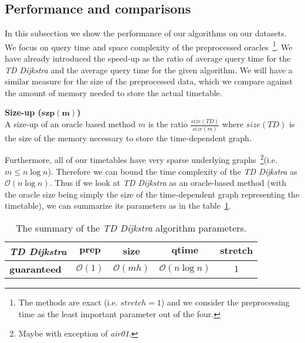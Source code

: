 \subsection{Performance and comparisons}

	\noindent In this subsection we show the performance of our algorithms on our datasets. We focus on query time and space complexity of the preprocessed oracles~\footnote{The methods are exact (i.e. $stretch = 1$) and we consider the preprocessing time as the least important parameter out of the four.}. We have already introduced the speed-up as the ratio of average query time for the \textit{TD Dijkstra} and the average query time for the given algorithm. We will have a similar measure for the size of the preprocessed data, which we compare against the amount of memory needed to store the actual timetable.
	
	\begin{definition}
		\textbf{Size-up ($\bm{szp(m)}$)}\\
		A size-up of an oracle based method $m$ is the ratio $\frac{\displaystyle size(TD)}{\displaystyle size(m)}$ where $size(TD)$ is the size of the memory necessary to store the time-dependent graph.
	\end{definition}
	
	\noindent Furthermore, all of our timetables have very sparse underlying graphs~\footnote{Maybe with exception of \textit{air01}.}(i.e. $m \leq n \log n$). Therefore we can bound the time complexity of the \textit{TD Dijkstra} as $\mathcal{O}(n \log n)$. Thus if we look at \textit{TD Dijkstra} as an oracle-based method (with the oracle size being simply the size of the time-dependent graph representing the timetable), we can summarize its parameters as in the table~\ref{tab:tddijkstra}.
	
	\begin{table}[h!]
		\centering
		\begin{tabular}{l|c|c|c|c}
			\cellcolor{oracle-clr} \textit{\textbf{TD Dijkstra}} & \cellcolor{oracle-clr} $\bm{prep}$ & \cellcolor{oracle-clr} $\bm{size}$ & \cellcolor{oracle-clr} $\bm{qtime}$ & \cellcolor{oracle-clr} $\bm{stretch}$ \\
			\hline
			\cellcolor{oracle-clr} \textbf{guaranteed} & $\mathcal{O}(1)$ & $\mathcal{O}(m h)$ & $\mathcal{O}(n \log n)$ & $1$ \\
		\end{tabular}
		\caption{\label{tab:tddijkstra} The summary of the \textit{TD Dijkstra} algorithm parameters.}
	\end{table}


